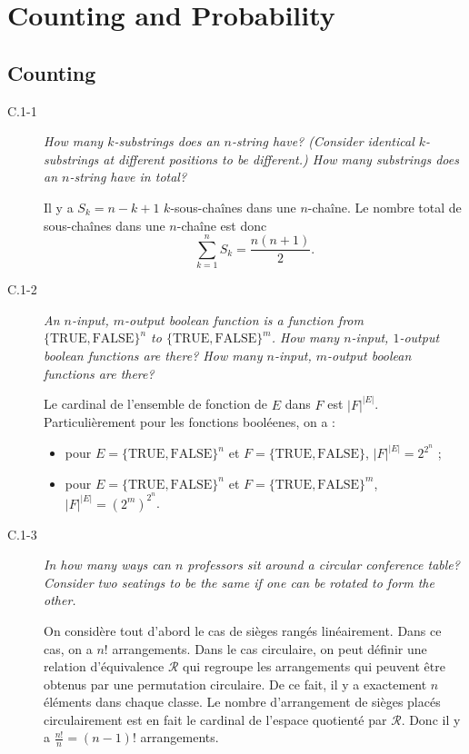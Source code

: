 \section{Counting and Probability}

\subsection{Counting}

\begin{description}
  \item[C.1-1] {\itshape How many $k$-substrings does an $n$-string have? (Consider identical $k$-substrings at different positions to be different.) How many substrings does an $n$-string have in total?}
    \begin{ex}
      Il y a $S_k = n - k + 1$ $k$-sous-cha\^ines dans une $n$-cha\^ine. Le nombre total de sous-cha\^ines dans une $n$-cha\^ine est donc \[\sum_{k=1}^n S_k = \frac{n(n+1)}{2}.\]
    \end{ex}
  \item[C.1-2] {\itshape An $n$-input, $m$-output boolean function is a function from  $\{\textrm{TRUE}, \textrm{FALSE}\}^n$ to $\{\textrm{TRUE}, \textrm{FALSE}\}^m$. How many $n$-input, $1$-output boolean functions are there? How many $n$-input, $m$-output boolean functions are there?}
    \begin{ex}
      Le cardinal de l'ensemble de fonction de $E$ dans $F$  est $|F|^{|E|}$. Particuli\`erement pour les fonctions bool\'eenes, on a :
      \begin{itemize}
        \item pour $E = \{\textrm{TRUE}, \textrm{FALSE}\}^n$ et $F=\{\textrm{TRUE}, \textrm{FALSE}\}$, $|F|^{|E|} = 2^{2^n}$ ;
        \item pour $E = \{\textrm{TRUE}, \textrm{FALSE}\}^n$ et $F=\{\textrm{TRUE}, \textrm{FALSE}\}^m$, $|F|^{|E|} = {(2^m)}^{2^n}$.
      \end{itemize}
    \end{ex}
  \item[C.1-3] {\itshape In how many ways can $n$ professors sit around a circular conference table? Consider two seatings to be the same if one can be rotated to form the other.}

    \begin{ex}
      On consid\`ere tout d'abord le cas de si\`eges rang\'es lin\'eairement. Dans ce cas, on a $n!$ arrangements. Dans le cas circulaire, on peut d\'efinir une relation d'\'equivalence $\mathcal{R}$ qui regroupe les arrangements qui peuvent \^etre obtenus par une permutation circulaire. De ce fait, il y a exactement $n$ \'el\'ements dans chaque classe. Le nombre d'arrangement de si\`eges plac\'es circulairement est en fait le cardinal de l'espace quotient\'e par $\mathcal{R}$. Donc il y a $\frac{n!}{n} = (n-1)!$ arrangements.
    \end{ex}


\end{description}
